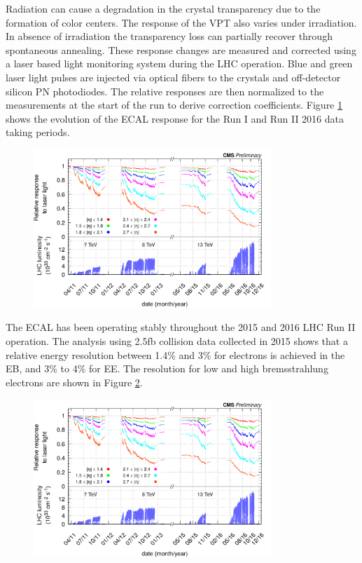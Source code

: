 \documentclass[thesis.tex]{subfiles}
\begin{document}
Radiation can cause a degradation in the crystal transparency due to the formation of color centers. 
The response of the VPT also varies under irradiation. 
In absence of irradiation the transparency loss can partially recover through spontaneous annealing. 
These response changes are measured and corrected using a laser based light monitoring system during the LHC operation. 
Blue and green laser light pulses are injected via optical fibers to the crystals and off-detector silicon PN photodiodes. 
The relative responses are then normalized to the measurements at the start of the run to derive correction coefficients. 
Figure \ref{fig:lasermonitor} shows the evolution of the ECAL response for the Run I and Run II 2016 data taking periods. 

\begin{figure}[hbtp]
	\centering
	\includegraphics[width=0.8\textwidth]{plot/lasermonitor.png}
	\label{fig:lasermonitor}
\end{figure}

The ECAL has been operating stably throughout the 2015 and 2016 LHC Run II operation.
The analysis using 2.5fb collision data collected in 2015 shows that a relative energy resolution
between 1.4\% and 3\% for electrons is achieved in the EB, and 3\% to 4\% for EE. The resolution for
low and high bremsstrahlung electrons are shown in Figure \ref{fig:ecalreso}.

\begin{figure}[hbtp]
	\centering
	\includegraphics[width=0.8\textwidth]{plot/lasermonitor.png}
	\label{fig:ecalreso}
\end{figure}
\end{document}
